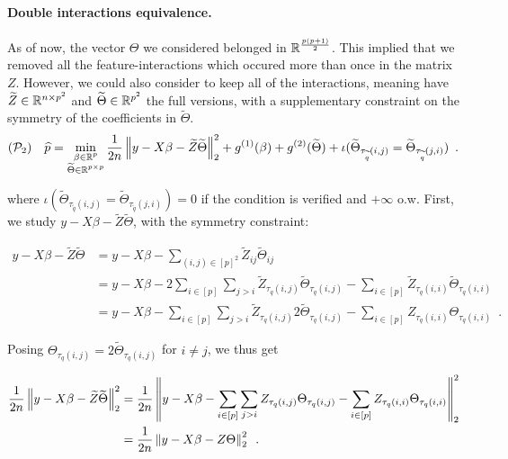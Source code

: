 \documentclass[a4]{article}
\begin{document}

\paragraph{Double interactions equivalence.} As of now, the vector $\Theta$ we considered belonged in $\mathbb{R}^{\frac{p(p+1)}{2}}$.
This implied that we removed all the feature-interactions which occured more than once in the matrix $Z$.
However, we could also consider to keep all of the interactions, meaning have $\widetilde Z\in\mathbb{R}^{n\times p^2}$ and $\widetilde\Theta\in\mathbb{R}^{p^2}$
the full versions, with a supplementary constraint on the symmetry of the coefficients in $\widetilde\Theta$.
\begin{equation}\label{eq:full}
(\mathcal{P}_2) \quad \widehat{p}
	 = \min_{\substack{\beta \in \mathbb{R}^p \\ \widetilde \Theta \in \mathbb{R}^{p\times p}}}
	\frac{1}{2n}\left \lVert y - X\beta - \widetilde Z\widetilde \Theta \right \rVert_2^2 + g^{(1)}(\beta) + g^{(2)}(\widetilde \Theta) + \iota(\widetilde \Theta_{\tau_{\widetilde q}(i,j)}=\widetilde \Theta_{\tau_{\widetilde q}(j,i)}) \enspace.
\end{equation}

where $\iota(\widetilde \Theta_{\tau_{\widetilde q}(i,j)}=\widetilde \Theta_{\tau_{\widetilde q}(j,i)}) = 0$ if the condition is verified and $+\infty$ o.w.
First, we study $y - X\beta - \widetilde Z\widetilde \Theta$, with the symmetry constraint:

\begin{align*}
	y - X\beta - \widetilde Z\widetilde \Theta
	& = y - X\beta - \sum_{(i,j)\in [p]^2} \widetilde Z_{ij} \widetilde \Theta_{ij} \\
	& = y - X\beta - 2\sum_{i\in[p]}\sum_{j>i} \widetilde Z_{\tau_q(i,j)} \widetilde \Theta_{\tau_q(i,j)} - \sum_{i\in [p]} \widetilde Z_{\tau_q(i,i)} \widetilde \Theta_{\tau_q(i,i)} \\
	& = y - X\beta - \sum_{i\in[p]}\sum_{j>i} \widetilde Z_{\tau_q(i,j)} 2\widetilde \Theta_{\tau_q(i,j)} - \sum_{i\in [p]} Z_{\tau_q(i,i)} \Theta_{\tau_q(i,i)}\enspace.
\end{align*}

Posing $\Theta_{\tau_q(i,j)} = 2 \widetilde\Theta_{\tau_q(i,j)}$ for $i\neq j$, we thus get

\begin{align*}
	\frac{1}{2n}\left \lVert y - X\beta - \widetilde Z\widetilde \Theta \right \rVert_2^2 &= \frac{1}{2n}\left \lVert y - X\beta - \sum_{i\in[p]}\sum_{j>i} Z_{\tau_q(i,j)} \Theta_{\tau_q(i,j)} - \sum_{i\in [p]} Z_{\tau_q(i,i)} \Theta_{\tau_q(i,i)} \right \rVert_2^2 \\
	&= \frac{1}{2n}\left \lVert y - X\beta - Z \Theta \right \rVert_2^2 \enspace.
\end{align*}
\end{document}
